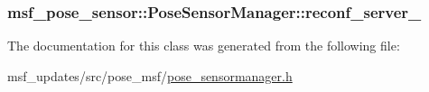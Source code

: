 \hypertarget{classmsf__pose__sensor_1_1PoseSensorManager_a7359d04f3db7cb6e8e23b5e28f900423}{
\subsubsection[{reconf\-\_\-server\-\_\-}]{ msf\-\_\-pose\-\_\-sensor\-::\-Pose\-Sensor\-Manager\-::reconf\-\_\-server\-\_\-\hspace{0.3cm}{\ttfamily [private]}}}\label{classmsf__pose__sensor_1_1PoseSensorManager_a7359d04f3db7cb6e8e23b5e28f900423}


The documentation for this class was generated from the following file\-:\begin{DoxyCompactItemize}
\item 
msf\-\_\-updates/src/pose\-\_\-msf/\hyperlink{pose__sensormanager_8h}{pose\-\_\-sensormanager.\-h}\end{DoxyCompactItemize}
